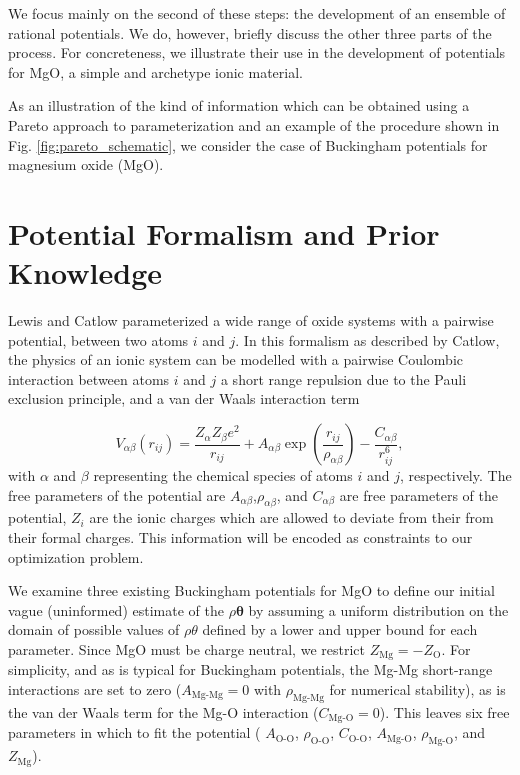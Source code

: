 We focus mainly on the second of these steps: the development of an ensemble of rational potentials. We do, however, briefly discuss the other three parts of the process. For concreteness, we illustrate their use in the development of potentials for MgO, a simple and archetype ionic material.

As an illustration of the kind of information which can be obtained using a Pareto approach to parameterization and an example of the procedure shown in Fig. \ref{fig:pareto_schematic}, we consider the case of Buckingham potentials for magnesium oxide (MgO).

\section{Potential Formalism and Prior Knowledge}

Lewis and Catlow\cite{lewis1985_buckingham} parameterized a wide range of oxide systems with a pairwise potential, between two atoms $i$ and $j$.  In this formalism as described by Catlow\cite{catlow1977_buckingham}, the physics of an ionic system can be modelled with a pairwise Coulombic interaction between atoms $i$ and $j$ a short range repulsion due to the Pauli exclusion principle, and a van der Waals interaction term\cite{buckingham1938}

\begin{equation}
	V_{\alpha\beta}(r_{ij}) =
			\frac{Z_{\alpha}Z_{\beta}e^2}{r_{ij}}
			+ A_{\alpha\beta} \exp \left(\frac{r_{ij}}
																				{\rho_{\alpha\beta}}
															\right)
			- \frac{C_{\alpha\beta}}
			       {r_{ij}^6},
\end{equation}
with $\alpha$ and $\beta$ representing the chemical species of atoms $i$ and $j$, respectively.  The free parameters of the potential are $A_{\alpha\beta}$,$\rho_{\alpha\beta}$, and $C_{\alpha\beta}$ are free parameters of the potential, $Z_i$ are the ionic charges which are allowed to deviate from their from their formal charges.  This information will be  encoded as constraints to our optimization problem.

We examine three existing Buckingham potentials for MgO to define our initial vague (uninformed) estimate of the $\rho{\bm{\theta}}$ by assuming a uniform distribution on the domain of possible values of $\rho{\theta}$ defined by a lower and upper bound for each parameter. Since MgO must be charge neutral, we restrict $Z_{\text{Mg}}= -Z_{\text{O}}$. For simplicity, and as is typical for Buckingham potentials, the Mg-Mg short-range interactions are set to zero ($A_\text{Mg-Mg}=0$ with $\rho_{\text{Mg-Mg}}$ for numerical stability), as is the van der Waals term for the Mg-O interaction ($C_{\text{Mg-O}}=0$). This leaves six free parameters in which to fit the potential (
$A_{\text{O-O}}$,
$\rho_{\text{O-O}}$,
$C_{\text{O-O}}$,
$A_{\text{Mg-O}}$,
$\rho_{\text{Mg-O}}$, and
$Z_{\text{Mg}}$).

